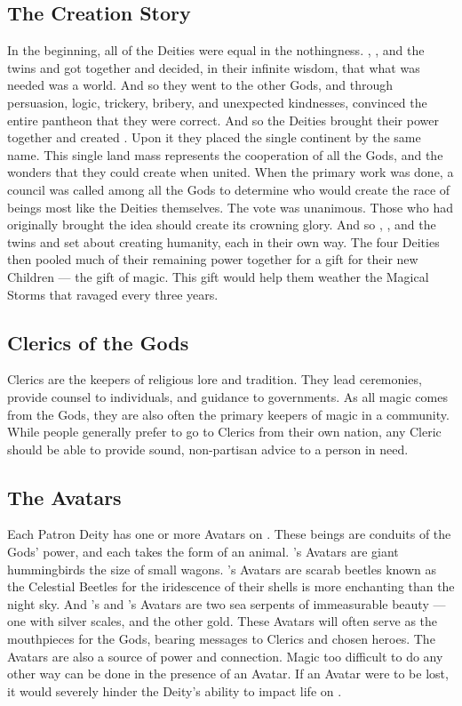 \documentclass[blue]{GL2020}
\begin{document}
\subsection*{The Creation Story}
In the beginning, all of the Deities were equal in the nothingness. \cFarmGod{}, \cTechGod{}, and the twins \cEbb{} and \cFlow{} got together and decided, in their infinite wisdom, that what was needed was a world. And so they went to the other Gods, and through persuasion, logic, trickery, bribery, and unexpected kindnesses, convinced the entire pantheon that they were correct. And so the Deities brought their power together and created \pEarth{}. Upon it they placed the single continent by the same name. This single land mass represents the cooperation of all the Gods, and the wonders that they could create when united. When the primary work was done, a council was called among all the Gods to determine who would create the race of beings most like the Deities themselves. The vote was unanimous. Those who had originally brought the idea should create its crowning glory. And so \cFarmGod{}, \cTechGod{}, and the twins \cEbb{} and \cFlow{} set about creating humanity, each in their own way. The four Deities then pooled much of their remaining power together for a gift for their new Children — the gift of magic. This gift would help them weather the Magical Storms that ravaged \pEarth{} every three years.

\subsection*{Clerics of the Gods}
Clerics are the keepers of religious lore and tradition. They lead ceremonies, provide counsel to individuals, and guidance to governments. As all magic comes from the Gods, they are also often the primary keepers of magic in a community. While people generally prefer to go to Clerics from their own nation, any Cleric should be able to provide sound, non-partisan advice to a person in need.

\subsection*{The Avatars}
Each Patron Deity has one or more Avatars on \pEarth{}. These beings are conduits of the Gods' power, and each takes the form of an animal. \cFarmGod{}'s Avatars are giant hummingbirds the size of small wagons. \cTechGod{}'s Avatars are scarab beetles known as the Celestial Beetles for the iridescence of their shells is more enchanting than the night sky. And \cEbb{}'s and \cFlow{}'s Avatars are two sea serpents of immeasurable beauty — one with silver scales, and the other gold. These Avatars will often serve as the mouthpieces for the Gods, bearing messages to Clerics and chosen heroes. The Avatars are also a source of power and connection. Magic too difficult to do any other way can be done in the presence of an Avatar. If an Avatar were to be lost, it would severely hinder the Deity's ability to impact life on \pEarth{}.
\end{document}
